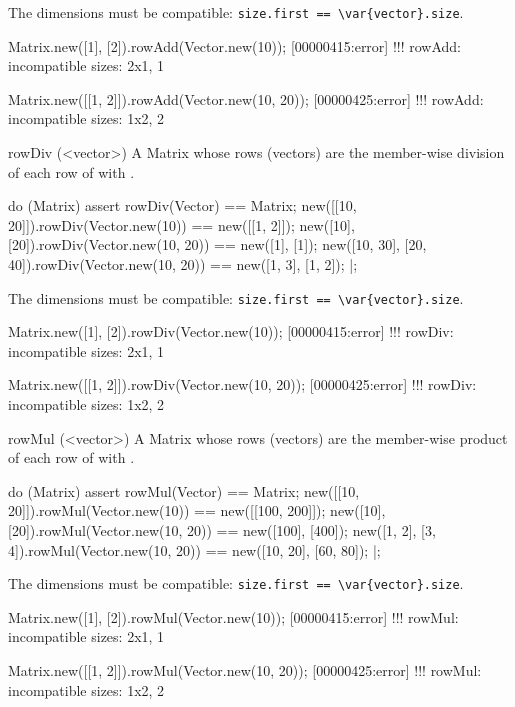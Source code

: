 \begin{urbiscriptapi}
  The dimensions must be compatible:
  \lstinline|size.first == \var{vector}.size|.
\begin{urbiscript}
Matrix.new([1], [2]).rowAdd(Vector.new(10));
[00000415:error] !!! rowAdd: incompatible sizes: 2x1, 1

Matrix.new([[1, 2]]).rowAdd(Vector.new(10, 20));
[00000425:error] !!! rowAdd: incompatible sizes: 1x2, 2
\end{urbiscript}

\item[rowDiv](<vector>)%
  A Matrix whose rows (vectors) are the member-wise division of each row of
  \this with .
\begin{urbiscript}
do (Matrix)
{
  assert
  {
    rowDiv(Vector) == Matrix;
    new([[10, 20]]).rowDiv(Vector.new(10))     == new([[1, 2]]);
    new([10], [20]).rowDiv(Vector.new(10, 20)) == new([1], [1]);
    new([10, 30], [20, 40]).rowDiv(Vector.new(10, 20)) == new([1, 3], [1, 2]);
  }
}|;
\end{urbiscript}

  The dimensions must be compatible:
  \lstinline|size.first == \var{vector}.size|.
\begin{urbiscript}
Matrix.new([1], [2]).rowDiv(Vector.new(10));
[00000415:error] !!! rowDiv: incompatible sizes: 2x1, 1

Matrix.new([[1, 2]]).rowDiv(Vector.new(10, 20));
[00000425:error] !!! rowDiv: incompatible sizes: 1x2, 2
\end{urbiscript}

\item[rowMul](<vector>)%
  A Matrix whose rows (vectors) are the member-wise product of each row of
  \this with .
\begin{urbiscript}
do (Matrix)
{
  assert
  {
    rowMul(Vector) == Matrix;
    new([[10, 20]]).rowMul(Vector.new(10))     == new([[100, 200]]);
    new([10], [20]).rowMul(Vector.new(10, 20)) == new([100], [400]);
    new([1, 2], [3, 4]).rowMul(Vector.new(10, 20)) == new([10, 20], [60, 80]);
  }
}|;
\end{urbiscript}

  The dimensions must be compatible:
  \lstinline|size.first == \var{vector}.size|.
\begin{urbiscript}
Matrix.new([1], [2]).rowMul(Vector.new(10));
[00000415:error] !!! rowMul: incompatible sizes: 2x1, 1

Matrix.new([[1, 2]]).rowMul(Vector.new(10, 20));
[00000425:error] !!! rowMul: incompatible sizes: 1x2, 2
\end{urbiscript}



\end{urbiscriptapi}
